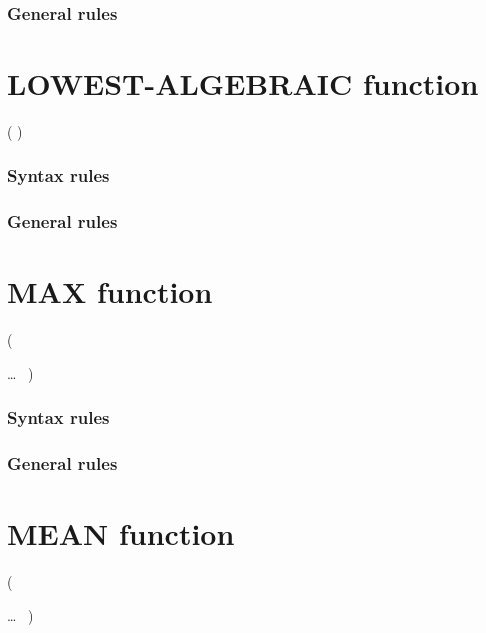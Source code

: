 \subsubsection{General rules}

\section{LOWEST-ALGEBRAIC function}

\begin{syntax}
    ( \argument )
\end{syntax}

\subsubsection{Syntax rules}

\subsubsection{General rules}

\section{MAX function}

\begin{syntax}
    (
  \begin{1=}
    \argument
  \end{1=}\ldots
  \ {})
\end{syntax}

\subsubsection{Syntax rules}

\subsubsection{General rules}

\section{MEAN function}

\begin{syntax}
    (
  \begin{1=}
    \argument
  \end{1=}\ldots
  \ {})
\end{syntax}

